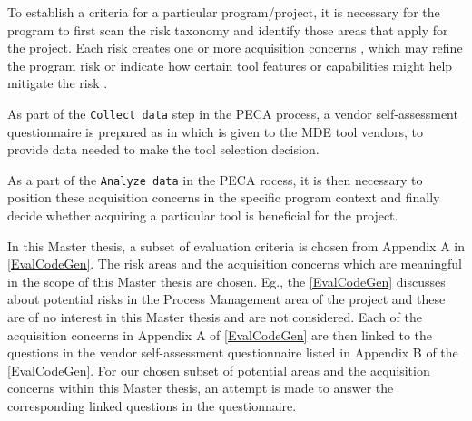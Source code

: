 To establish a criteria for a particular program/project, it is necessary for the program to first scan the risk taxonomy and identify those areas that apply for the project. Each risk creates one or more acquisition concerns , which may refine the program risk or indicate how certain tool features or capabilities might help mitigate the risk \cite{EvalCodeGen}.      

As part of the \texttt{Collect data} step in the PECA process, a vendor self-assessment questionnaire is prepared as in \cite{EvalCodeGen} which is given to the MDE tool vendors, to provide data needed to make the tool selection decision.

As a part of the \texttt{Analyze data} in the PECA rocess, it is then necessary to position these acquisition concerns in the specific program context and finally decide whether acquiring a particular tool is beneficial for the project.

In this Master thesis, a subset of evaluation criteria is chosen from Appendix A in \cref{EvalCodeGen}. The risk areas and the acquisition concerns which are meaningful in the scope of this Master thesis are chosen. Eg., the \cref{EvalCodeGen} discusses about potential risks in the Process Management area of the project and these are of no interest in this Master thesis and are not considered. Each of the acquisition concerns in Appendix A of \cref{EvalCodeGen} are then linked to the questions in the vendor self-assessment questionnaire listed in Appendix B of the \cref{EvalCodeGen}. For our chosen subset of potential areas and the acquisition concerns within this Master thesis, an attempt is made to answer the corresponding linked questions in the questionnaire.

